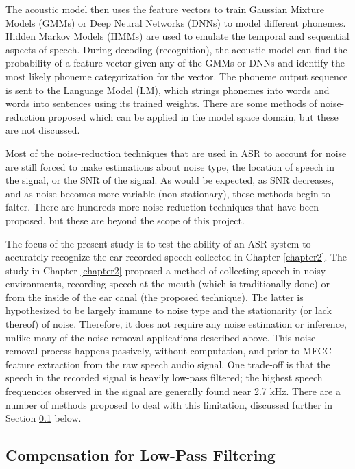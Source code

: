 The acoustic model then uses the feature vectors to train Gaussian Mixture Models (GMMs) or Deep Neural Networks (DNNs) to model different phonemes.  Hidden Markov Models (HMMs) are used to emulate the temporal and sequential aspects of speech. During decoding (recognition), the acoustic model can find the probability of a feature vector given any of the GMMs or DNNs and identify the most likely phoneme categorization for the vector.  The phoneme output sequence is sent to the Language Model (LM), which strings phonemes into words and words into sentences using its trained weights.  There are some methods of noise-reduction proposed which can be applied in the model space domain, but these are not discussed.

Most of the noise-reduction techniques that are used in ASR to account for noise are still forced to make estimations about noise type, the location of speech in the signal, or the SNR of the signal.  As would be expected, as SNR decreases, and as noise becomes more variable (non-stationary), these methods begin to falter.  There are hundreds more noise-reduction techniques that have been proposed, but these are beyond the scope of this project.

The focus of the present study is to test the ability of an ASR system to accurately recognize the ear-recorded speech collected in Chapter \ref{chapter2}.  The study in Chapter \ref{chapter2} proposed a method of collecting speech in noisy environments, recording speech at the mouth (which is traditionally done) or from the inside of the ear canal (the proposed technique).  The latter is hypothesized to be largely immune to noise type and the stationarity (or lack thereof) of noise.  Therefore, it does not require any noise estimation or inference, unlike many of the noise-removal applications described above.  This noise removal process happens passively, without computation, and prior to MFCC feature extraction from the raw speech audio signal.  One trade-off is that the speech in the recorded signal is heavily low-pass filtered; the highest speech frequencies observed in the signal are generally found near 2.7 kHz.  There are a number of methods proposed to deal with this limitation, discussed further in Section \ref{sec:lpf-compensation} below.


\subsection{Compensation for Low-Pass Filtering}\label{sec:lpf-compensation}

